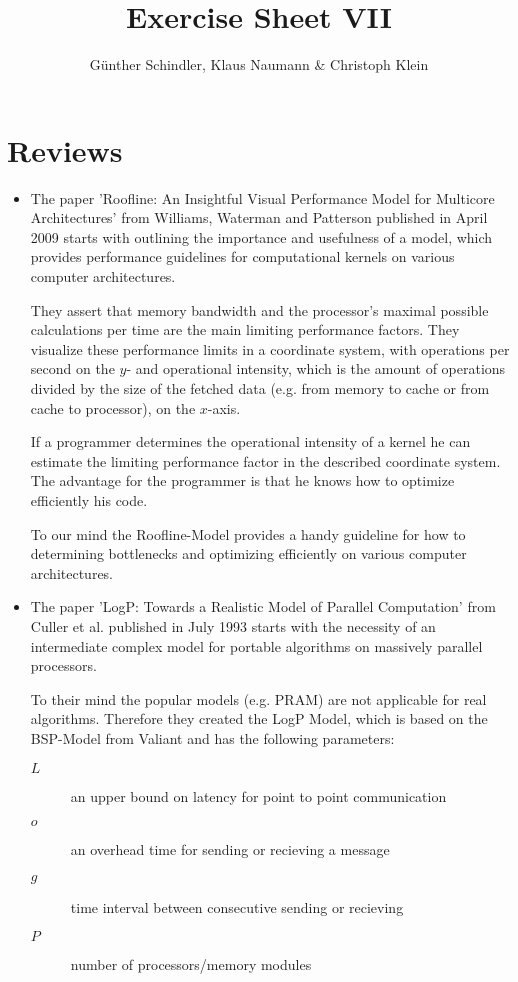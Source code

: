 \documentclass[oneside, a4paper, DIV=10]{scrartcl}
\title{Exercise Sheet VII}
\author{G\"unther Schindler, Klaus Naumann \& Christoph Klein}
\begin{document}
\maketitle


\section*{Reviews}
\begin{itemize}
    \item 
    The paper 'Roofline: An Insightful Visual Performance Model for Multicore
    Architectures' from Williams, Waterman and Patterson published in April 2009
    starts with outlining the importance and usefulness of a model, which provides
    performance guidelines for computational kernels on various computer
    architectures.

    They assert that memory bandwidth and the processor's maximal possible
    calculations per time are the main limiting performance factors. They
    visualize these performance limits in a coordinate system, with
    operations per second on the $y$- and operational intensity,  which is
    the amount of operations divided by the size of the fetched data
    (e.g. from memory to cache or from cache to processor), on the 
    $x$-axis.

    If a programmer determines the operational intensity of a kernel he can
    estimate the limiting performance factor in the described coordinate
    system. The advantage for the programmer is that he knows how to optimize
    efficiently his code.

    To our mind the Roofline-Model provides a handy guideline for how to
    determining bottlenecks and optimizing efficiently on various 
    computer architectures.

    \item
    The paper 'LogP: Towards a Realistic Model of Parallel Computation' from
    Culler et al. published in July 1993 starts with the necessity of an
    intermediate complex model for portable algorithms on massively parallel
    processors. 
    
    To their mind the popular models (e.g. PRAM) are not applicable for real
    algorithms. Therefore they created the LogP Model, which is based on the BSP-Model
    from Valiant and has the following parameters:
    
    \begin{description}
        \item[$L$] an upper bound on latency for point to point communication
        \item[$o$] an overhead time for sending or recieving a message
        \item[$g$] time interval between consecutive sending or recieving
        \item[$P$] number of processors/memory modules
    \end{description}
    

\end{itemize}
\end{document}
